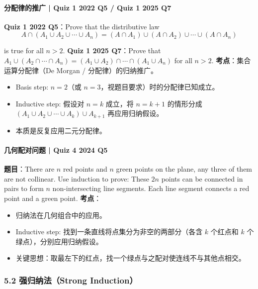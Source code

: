 \documentclass[10pt,a4paper,openany]{ctexbook}
\theoremstyle{definition}
\theoremstyle{remark}
\begin{document}
\vspace{-2pt}

\paragraph{分配律的推广 | Quiz 1 2022 Q5 / Quiz 1 2025 Q7}

\textbf{Quiz 1 2022 Q5}：Prove that the distributive law
\[
A \cap (A_1 \cup A_2 \cup \cdots \cup A_n) = (A \cap A_1) \cup (A \cap A_2) \cup \cdots \cup (A \cap A_n)
\]

is true for all $n > 2$.
\textbf{Quiz 1 2025 Q7}：Prove that $A_1 \cup (A_2 \cap \cdots \cap A_n) = (A_1 \cup A_2) \cap \cdots \cap (A_1 \cup A_n)$ for all $n > 2$.
\textbf{考点}：集合运算分配律（De Morgan / 分配律）的归纳推广。
\begin{itemize}
\item Basis step: $n=2$（或 $n=3$，视题目要求）时的分配律已知成立。
\item Inductive step: 假设对 $n=k$ 成立，将 $n=k+1$ 的情形分成 $(A_1 \cup A_2 \cup \cdots \cup A_k) \cup A_{k+1}$ 再应用归纳假设。
\item 本质是反复应用二元分配律。

\end{itemize}

\vspace{-2pt}

\paragraph{几何配对问题 | Quiz 4 2024 Q5}

\textbf{题目}：There are $n$ red points and $n$ green points on the plane, any three of them are not collinear. Use induction to prove: These $2n$ points can be connected in pairs to form $n$ non-intersecting line segments. Each line segment connects a red point and a green point.
\textbf{考点}：
\begin{itemize}
\item 归纳法在几何组合中的应用。
\item Inductive step: 找到一条直线将点集分为非空的两部分（各含 $k$ 个红点和 $k$ 个绿点），分别应用归纳假设。
\item 关键思想：取最左下的红点，找一个绿点与之配对使连线不与其他点相交。

\end{itemize}

\vspace{-2pt}

\subsubsection{5.2 强归纳法（Strong Induction）}
\end{document}
